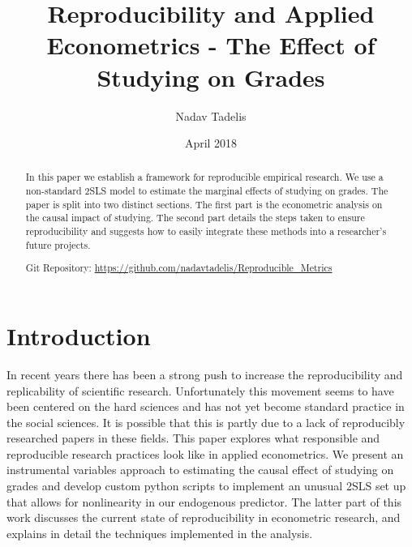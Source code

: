\documentclass[12pt]{article}
\begin{document}
\title{Reproducibility and Applied Econometrics - The Effect of Studying on Grades}

\author{Nadav Tadelis}

\date{April 2018}



\maketitle

\hskip 80pt 


\begin{abstract}
In this paper we establish a framework for reproducible empirical research. We use a non-standard 2SLS model to estimate the marginal effects of studying on grades. The paper is split into two distinct sections. The first part is the econometric analysis on the causal impact of studying. The second part details the steps taken to ensure reproducibility and suggests how to easily integrate these methods into a researcher's future projects.

\vspace{3mm}
\noindent Git Repository: \url{https://github.com/nadavtadelis/Reproducible_Metrics}
\end{abstract}

\clearpage


\section{Introduction}
\label{sec_intro}
In recent years there has been a strong push to increase the reproducibility and replicability of scientific research. Unfortunately this movement seems to have been centered on the hard sciences and has not yet become standard practice in the social sciences. It is possible that this is partly due to a lack of reproducibly researched papers in these fields. This paper explores what responsible and reproducible research practices look like in applied econometrics. We present an instrumental variables approach to estimating the causal effect of studying on grades and develop custom python scripts to implement an unusual 2SLS set up that allows for nonlinearity in our endogenous predictor. The latter part of this work discusses the current state of reproducibility in econometric research, and explains in detail the techniques implemented in the analysis.
\end{document}
